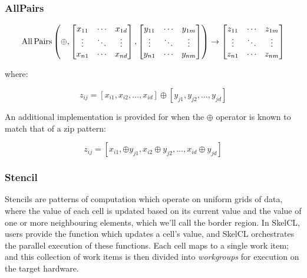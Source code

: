 \subsubsection{AllPairs}

\begin{equation}
\operatorname*{All\,Pairs} \left( \oplus,
\begin{bmatrix}
  x_{11} & \cdots & x_{1d} \\
  \vdots & \ddots & \vdots \\
  x_{n1} & \cdots & x_{nd}
\end{bmatrix},
\begin{bmatrix}
  y_{11} & \cdots & y_{1m} \\
  \vdots & \ddots & \vdots \\
  y_{n1} & \cdots & y_{nm}
\end{bmatrix} \right)
\to
\begin{bmatrix}
  z_{11} & \cdots & z_{1m} \\
  \vdots & \ddots & \vdots \\
  z_{n1} & \cdots & z_{nm}
\end{bmatrix}
\end{equation}

where:

\begin{equation}
z_{ij} =
\left[ x_{i1}, x_{i2}, \ldots, x_{id} \right] \oplus
\left[ y_{j1}, y_{j2}, \ldots, y_{jd} \right]
\end{equation}

An additional implementation is provided for when the $\oplus$
operator is known to match that of a zip pattern:

\begin{equation}
z_{ij} =
\left[
  x_{i1}, \oplus y_{j1}, x_{i2} \oplus y_{j2}, \ldots, x_{id} \oplus y_{jd}
\right]
\end{equation}


\subsubsection{Stencil}

Stencils are patterns of computation which operate on uniform grids of
data, where the value of each cell is updated based on its current
value and the value of one or more neighbouring elements, which we'll
call the border region. In SkelCL, users provide the function which
updates a cell's value, and SkelCL orchestrates the parallel execution
of these functions. Each cell maps to a single work item; and this
collection of work items is then divided into \emph{workgroups} for
execution on the target hardware.

